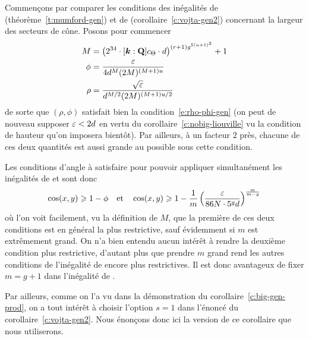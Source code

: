 Commençons par comparer les conditions des inégalités de 
(théorème~\vref{t:mumford-gen}) et de 
(corollaire~\vref{c:vojta-gen2}) concernant la largeur des secteurs de cône.
Posons pour commencer
\begin{align}
  M
  & =
  \bigl(
  2^{34} \cdot [\cdn : \Q] \hlclab \cdot \adeg
  \bigr)^{ (r+1) g^{ 5(\adim + 1)^2 } }
  + 1
  \\
  \phi
  & =
  \frac{ \eps }{ 4 \adeg^M (2M)^{(M+1)\adim} }
  \\
  \rho
  & =
  \frac{ \sqrt\eps }{ \adeg^{M/2} (2M)^{(M+1)\adim/2} }
\end{align}
de sorte que \( (\rho, \phi) \) satisfait bien la
condition~\eqref{e:rho-phi-gen} (on peut de nouveau supposer \( \varepsilon < 2d
\) en vertu du corollaire~\vref{c:nobig-liouville} vu la condition de hauteur
qu'on imposera bientôt). Par ailleurs, à un facteur \( 2 \) près, chacune de
ces deux quantités est aussi grande au possible sous cette condition.

Les conditions d'angle à satisfaire pour pouvoir appliquer simultanément les
inégalités de  et  sont donc
\begin{equation}
  \cos(x, y) \geqslant 1 - \phi
  \quad\text{et}\quad
  \cos(x, y) \geqslant 1 -
  \frac1m
  \left(
    \frac{ \varepsilon }{ 86 N \cdot 5^g d }
  \right)^{ \frac{m}{m-g} }
\end{equation}
où l'on voit facilement, vu la définition de \( M \), que la première de ces
deux conditions est en général la plus restrictive, sauf évidemment si \( m \)
est extrêmement grand. On n'a bien entendu aucun intérêt à rendre la deuxième
condition plus restrictive, d'autant plus que prendre \( m \) grand rend les
autres conditions de l'inégalité de  encore plus restrictives. Il
est donc avantageux de fixer \( m = g+1 \) dans l'inégalité de .

Par ailleurs, comme on l'a vu dans la démonstration du
corollaire~\vref{c:big-gen-prod}, on a tout intérêt à choisir l'option \( s =
  1 \) dans l'énoncé du corollaire~\vref{c:vojta-gen2}. Nous énonçons donc
ici la version de ce corollaire que nous utiliserons.

